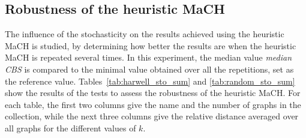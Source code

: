\documentclass{scrartcl}
\theoremstyle{plain}
\newcommand{\algo}{MaCH}
\newcommand{\cbs}{CBS}
\begin{document}
\subsection{Robustness of the heuristic \algo{}}
\label{subsec:robustness}

The influence of the stochasticity on the results achieved using the heuristic  
\algo{} is studied, by determining how better the results are when the heuristic 
\algo{} is repeated several times. In this experiment, the median value 
\emph{median 
\cbs} is compared to the minimal value obtained over all the repetitions, set 
as the reference value. Tables~\ref{tab:harwell_sto_sum} and 
\ref{tab:random_sto_sum} show the results of the tests to assess the robustness 
of the heuristic \algo{}. For each table, the first two columns give the name 
and the number of graphs in the collection, while the next three columns give 
the 
relative distance averaged over all graphs for the different values of $k$.
\end{document}
